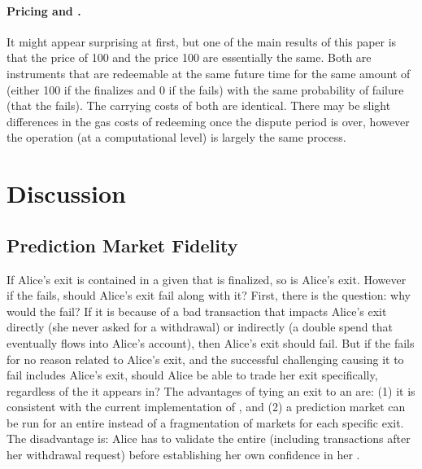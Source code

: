 \paragraph{Pricing \final and \fail.}

It might appear surprising at first, but one of the main results of this paper is that the price of 100 \ethxx and the price 100 \fail are essentially the same. Both are instruments that are redeemable at the same future time for the same amount of \ethone (either 100 if the \rblock finalizes and 0 if the \rblock fails) with the same probability of failure (that the \rblock fails). The carrying costs of both are identical. There may be slight differences in the gas costs of redeeming \ethone once the dispute period is over, however the operation (at a computational level) is largely the same process. 

\section{Discussion}

\subsection{Prediction Market Fidelity}
\label{sec:fidelity}


If Alice's exit is contained in a given \rblock that is finalized, so is Alice's exit. However if the \rblock fails, should Alice's exit fail along with it? First, there is the question: why would the \rblock fail? If it is because of a bad transaction that impacts Alice's exit directly (\eg she never asked for a withdrawal) or indirectly (\eg a double spend that eventually flows into Alice's account), then Alice's exit should fail. But if the \rblock fails for no reason related to Alice's exit, and the successful challenging \rblock causing it to fail includes Alice's exit, should Alice be able to trade her exit specifically, regardless of the \rblock it appears in? The advantages of tying an exit to an \rblock are: (1) it is consistent with the current implementation of \arb, and (2) a prediction market can be run for an entire \rblock instead of a fragmentation of markets for each specific exit. The disadvantage is: Alice has to validate the entire \rblock (including transactions after her withdrawal request) before establishing her own confidence in her \ethxx. 

